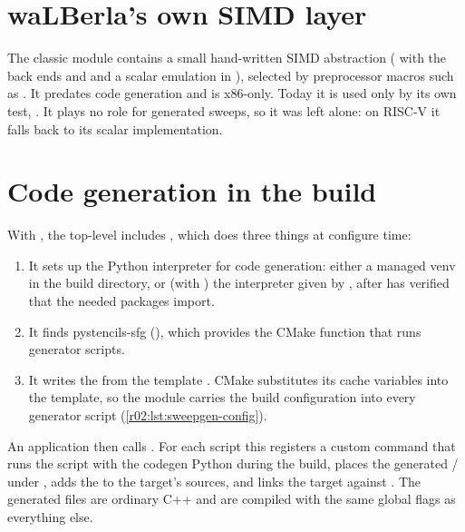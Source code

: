 \section{waLBerla's own SIMD layer}\label{r02:sec:simd-module}

The classic module  contains a small hand-written SIMD abstraction
( with the back ends  and  and a scalar emulation
in ), selected by preprocessor macros such as . It predates
code generation and is x86-only. Today it is used only by its own test,
. It plays no role for generated sweeps, so it was
left alone: on RISC-V it falls back to its scalar implementation.

\section{Code generation in the build}\label{r02:sec:cmake-codegen}

With , the top-level 
includes , which does three things at configure
time:
\begin{enumerate}
  \item It sets up the Python interpreter for code generation: either a managed venv in
        the build directory, or (with ) the
        interpreter given by , after
         has verified that the needed packages import.
  \item It finds pystencils-sfg (), which provides
        the CMake function that runs generator scripts.
  \item It writes the 
         from the template
        . CMake
        substitutes its cache variables into the template, so the module carries the
        build configuration into every generator script (\cref{r02:lst:sweepgen-config}).
\end{enumerate}
An application then calls .
For each script this registers a custom command that runs the script with the codegen
Python during the build, places the generated / under
, adds the  to the target's sources, and
links the target against . The generated files are ordinary
C++ and are compiled with the same global flags as everything else.

